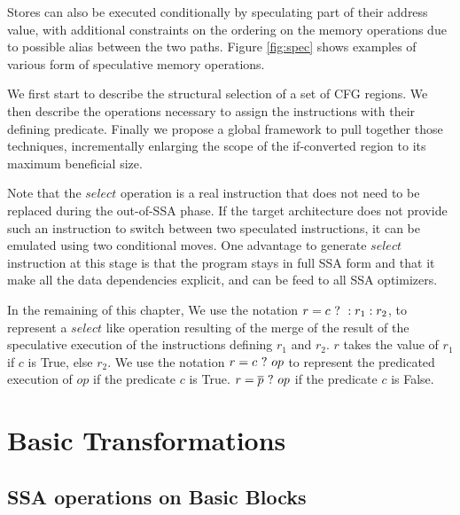 Stores can also be executed conditionally by speculating part of their address value, with additional constraints on the ordering on the memory operations due to possible alias between the two paths. Figure \ref{fig:spec} shows examples of various form of speculative memory operations.

We first start to describe the structural selection of a set of CFG regions. We then describe the operations necessary to assign the instructions with their defining predicate. Finally we propose a global framework to pull together those techniques, incrementally enlarging the scope of the if-converted region to its maximum beneficial size.

Note that the $select$ operation is a real instruction that does not need to be replaced during the out-of-SSA phase. If the target architecture does not provide such an instruction to switch between two speculated instructions, it can be emulated using two conditional moves. One advantage to generate $select$ instruction at this stage is that the program stays in full SSA form and that it make all the data dependencies explicit, and can be feed to all SSA optimizers. 

In the remaining of this chapter, We use the notation $r = c ~?~ :r_1:r_2$, to represent a $select$ like operation resulting of the merge of the result of the speculative execution of the instructions defining $r_1$ and $r_2$. $r$ takes the value of $r_1$ if $c$ is True, else $r_2$. We use the notation $r = c ~?~ op$ to represent the predicated execution of $op$ if the predicate $c$ is True. $r = \overline{p} ~?~ op$ if the predicate $c$ is False.

\section{Basic Transformations}
\label{sec:basic}

\subsection{SSA operations on Basic Blocks}

